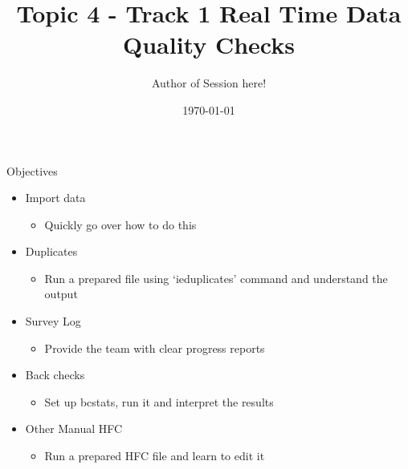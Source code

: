 \documentclass[aspectratio=169]{beamer}
\title{Topic 4 - Track 1 \newline Real Time Data Quality Checks}
\date{\today}
\author{Author of Session here!} %
\institute{Development Impact Evaluation (DIME) \newline The World Bank }
\begin{document}
	
	{
		\maketitle
	}

\begin{frame}{Objectives}
	\begin{itemize}
		\item Import data
			\begin{itemize}
				\item Quickly go over how to do this
			\end{itemize}
		\item Duplicates
			\begin{itemize}
				\item Run a prepared file using ‘ieduplicates’ command and understand the output
			\end{itemize}
		\item Survey Log
			\begin{itemize}
				\item Provide the team with clear progress reports
			\end{itemize}
		\item Back checks 
			\begin{itemize}
				\item Set up bcstats, run it and interpret the results
			\end{itemize}
		\item Other Manual HFC
			\begin{itemize}
				\item Run a prepared HFC file and learn to edit it
			\end{itemize}
	\end{itemize}
\end{frame}
\end{document}
